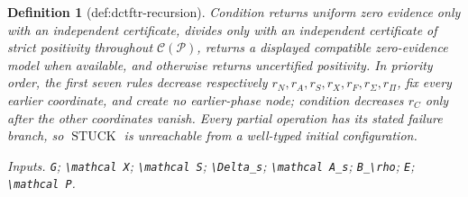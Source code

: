 \documentclass{article}
\newtheorem{definition}{Definition}
\begin{document}
\begin{definition}[def:dctftr-recursion]
Condition returns uniform zero evidence only with an independent certificate, divides only with an independent certificate of strict positivity throughout \(\mathcal C(\mathcal P)\), returns a displayed compatible zero-evidence model when available, and otherwise returns uncertified positivity.  In priority order, the first seven rules decrease respectively \(r_N,r_A,r_S,r_X,r_F,r_\Sigma,r_\Pi\), fix every earlier coordinate, and create no earlier-phase node; condition decreases \(r_C\) only after the other coordinates vanish.  Every partial operation has its stated failure branch, so \(\operatorname{STUCK}\) is unreachable from a well-typed initial configuration.
\par\smallskip\noindent\emph{Inputs.} \texttt{G}; \texttt{\textbackslash{}\allowbreak{}mathcal X}; \texttt{\textbackslash{}\allowbreak{}mathcal S}; \texttt{\textbackslash{}\allowbreak{}Delta\_\allowbreak{}s}; \texttt{\textbackslash{}\allowbreak{}mathcal A\_\allowbreak{}s}; \texttt{B\_\allowbreak{}\textbackslash{}\allowbreak{}rho}; \texttt{E}; \texttt{\textbackslash{}\allowbreak{}mathcal P}.
\end{definition}
\end{document}

